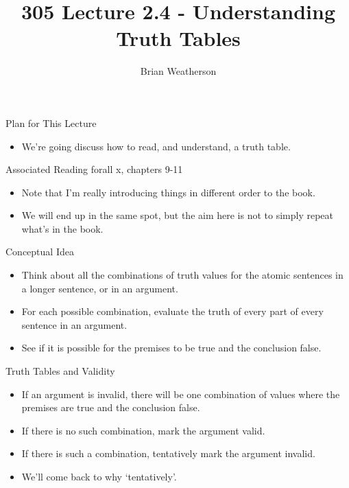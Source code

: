 \documentclass[
  ignorenonframetext,
]{beamer}
\title{305 Lecture 2.4 - Understanding Truth Tables}
\author{Brian Weatherson}
\date{}
\providecommand{\tightlist}{%
  \setlength{\itemsep}{0pt}\setlength{\parskip}{0pt}}
\renewcommand{\,}{\text{, }}
\begin{document}
\frame{\titlepage}

\begin{frame}{Plan for This Lecture}
\protect\hypertarget{plan-for-this-lecture}{}
\begin{itemize}
\tightlist
\item
  We're going discuss how to read, and understand, a truth table.
\end{itemize}
\end{frame}

\begin{frame}{Associated Reading}
\protect\hypertarget{associated-reading}{}
forall x, chapters 9-11

\begin{itemize}
\tightlist
\item
  Note that I'm really introducing things in different order to the
  book.
\item
  We will end up in the same spot, but the aim here is not to simply
  repeat what's in the book.
\end{itemize}
\end{frame}

\begin{frame}{Conceptual Idea}
\protect\hypertarget{conceptual-idea}{}
\begin{itemize}[<+->]
\tightlist
\item
  Think about all the combinations of truth values for the atomic
  sentences in a longer sentence, or in an argument.
\item
  For each possible combination, evaluate the truth of every part of
  every sentence in an argument.
\item
  See if it is possible for the premises to be true and the conclusion
  false.
\end{itemize}
\end{frame}

\begin{frame}{Truth Tables and Validity}
\protect\hypertarget{truth-tables-and-validity}{}
\begin{itemize}[<+->]
\tightlist
\item
  If an argument is invalid, there will be one combination of values
  where the premises are true and the conclusion false.
\item
  If there is no such combination, mark the argument valid.
\item
  If there is such a combination, tentatively mark the argument invalid.
\item
  We'll come back to why `tentatively'.
\end{itemize}
\end{frame}
\end{document}
